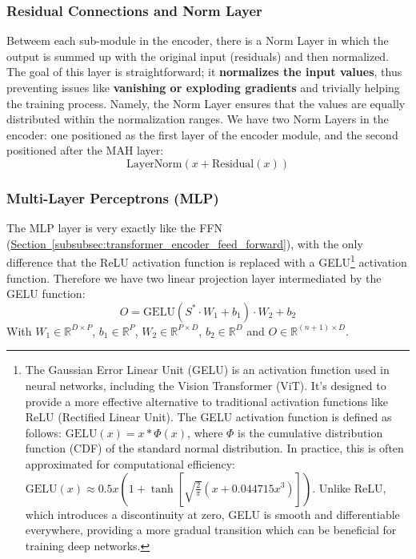 \documentclass[12pt]{article}
\begin{document}
\subsubsection{Residual Connections and Norm Layer}
Betweem each sub-module in the encoder, there is a Norm Layer in which the output is summed up with the 
original input (residuals) and then normalized. The goal of this layer is straightforward; it \textbf{normalizes the input values}, thus preventing issues like \textbf{vanishing or exploding 
gradients} and trivially helping the training process. Namely, the Norm Layer ensures that the values are 
equally distributed within the normalization ranges. We have two Norm Layers in the encoder: one positioned 
as the first layer of the encoder module, and the second positioned after the MAH layer:
\begin{equation}
    \text{LayerNorm}(x + \text{Residual}(x))
\end{equation}

\subsubsection{Multi-Layer Perceptrons (MLP)}
The MLP layer is very exactly like the FFN (\hyperref[subsubsec:transformer_encoder_feed_forward]{Section~\ref*{subsubsec:transformer_encoder_feed_forward}}),
with the only difference that the ReLU activation function is replaced with a GELU\footnote{The Gaussian Error 
Linear Unit (GELU) is an activation function used in neural networks, including the Vision Transformer (ViT). 
It's designed to provide a more effective alternative to traditional activation functions like ReLU 
(Rectified Linear Unit). The GELU activation function is defined as follows: $\text{GELU}(x)=x * \Phi(x)$, where $\Phi$
is the cumulative distribution function (CDF) of the standard normal distribution. In practice, this is often approximated for computational efficiency:
$\text{GELU}(x) \approx 0.5x \left(1 + \tanh\left[\sqrt{\frac{2}{\pi}} \left(x + 0.044715x^3\right)\right]\right)$. 
Unlike ReLU, which introduces a discontinuity at zero, GELU is smooth and differentiable everywhere, providing a more gradual transition which can be 
beneficial for training deep networks.} activation function. Therefore 
we have two linear projection layer intermediated by the GELU function:
\begin{equation}
    O = \text{GELU}(S^* \cdot W_1 + b_1) \cdot W_2 + b_2
\end{equation}
With $W_1 \in \mathbb{R}^{D \times P}$, $b_1 \in \mathbb{R}^P$, $W_2 \in \mathbb{R}^{P \times D}$, 
$b_2 \in \mathbb{R}^D$ and $O \in \mathbb{R}^{(n+1) \times D}$.
\end{document}
